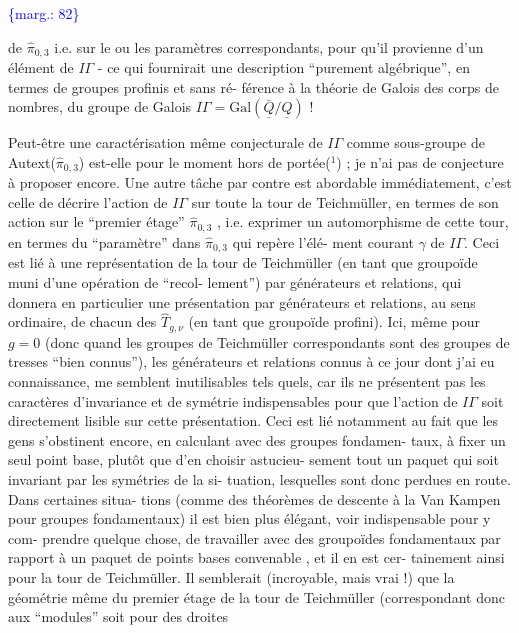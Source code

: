 \documentclass[11pt]{article}
\newcommand{\scanpage}[1]{\par\bigskip\noindent{\small\sffamily[scan #1]}\par}
\newcommand{\mspage}[1]{{\small\sffamily[p.\,#1]}}
\newcommand{\margin}[1]{\textcolor{blue}{\{\textsf{marg.:} #1\}}}
\begin{document}
\margin{82}

\clearpage
\scanpage{119/83}
\mspage{5}

de $\hat{\pi}_{0,3}$ i.e. sur le ou les paramètres correspondants, pour qu'il
provienne d'un élément de $I\!\Gamma$ - ce qui fournirait une description
``purement algébrique'', en termes de groupes profinis et sans ré-%
férence à la théorie de Galois des corps de nombres, du groupe de
Galois $I\!\Gamma = \mathrm{Gal}(\bar{\underline{Q}}/\underline{Q})$ !

Peut-être une caractérisation même conjecturale de $I\!\Gamma$
comme sous-groupe de Autext($\hat{\pi}_{0,3}$) est-elle pour le moment hors de
portée($^1$) ; je n'ai pas de conjecture à proposer encore. Une autre
tâche par contre est abordable immédiatement, c'est celle de décrire
l'action de $I\!\Gamma$ sur toute la tour de Teichmüller, en termes de son
action sur le ``premier étage'' $\hat{\pi}_{0,3}$ , i.e. exprimer un automorphisme
de cette tour, en termes du ``paramètre'' dans $\hat{\pi}_{0,3}$ qui repère l'élé-%
ment courant $\gamma$ de $I\!\Gamma$. Ceci est lié à une représentation de la tour
de Teichmüller (en tant que groupoïde muni d'une opération de ``recol-%
lement'') par générateurs et relations, qui donnera en particulier
une présentation par générateurs et relations, au sens ordinaire, de
chacun des $\hat{T}_{g,\nu}$ (en tant que groupoïde profini). Ici, même pour
$g = 0$ (donc quand les groupes de Teichmüller correspondants sont
des groupes de tresses ``bien connus''), les générateurs et relations
connus à ce jour dont j'ai eu connaissance, me semblent inutilisables
tels quels, car ils ne présentent pas les caractères d'invariance et
de symétrie indispensables pour que l'action de $I\!\Gamma$ soit directement
lisible sur cette présentation. Ceci est lié notamment au fait que
les gens s'obstinent encore, en calculant avec des groupes fondamen-%
taux, à fixer un seul point base, plutôt que d'en choisir astucieu-%
sement tout un paquet qui soit invariant par les symétries de la si-%
tuation, lesquelles sont donc perdues en route. Dans certaines situa-%
tions (comme des théorèmes de descente à la Van Kampen pour groupes
fondamentaux) il est bien plus élégant, voir indispensable pour y com-%
prendre quelque chose, de travailler avec des groupoïdes fondamentaux
par rapport à un paquet de points bases convenable , et il en est cer-%
tainement ainsi pour la tour de Teichmüller. Il semblerait (incroyable,
mais vrai !) que la géométrie même du premier étage de la tour de
Teichmüller (correspondant donc aux ``modules'' soit pour des droites
\end{document}
